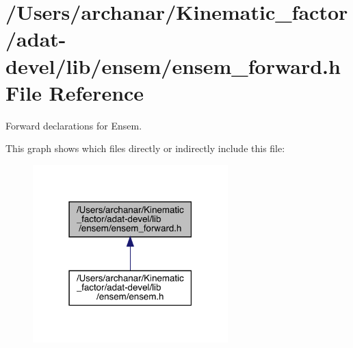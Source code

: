 \hypertarget{adat-devel_2lib_2ensem_2ensem__forward_8h}{}\section{/\+Users/archanar/\+Kinematic\+\_\+factor/adat-\/devel/lib/ensem/ensem\+\_\+forward.h File Reference}
\label{adat-devel_2lib_2ensem_2ensem__forward_8h}


Forward declarations for Ensem.  


This graph shows which files directly or indirectly include this file\+:
\nopagebreak
\begin{figure}[H]
\begin{center}
\leavevmode
\includegraphics[width=214pt]{dd/dbb/adat-devel_2lib_2ensem_2ensem__forward_8h__dep__incl}
\end{center}
\end{figure}
